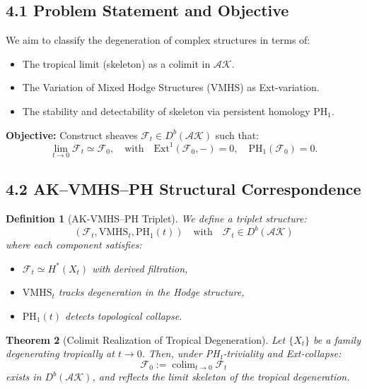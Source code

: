 \documentclass[11pt]{article}
\DeclareMathOperator{\colim}{colim}
\newtheorem{theorem}{Theorem}[section]
\newtheorem{definition}[theorem]{Definition}
\begin{document}
\subsection{4.1 Problem Statement and Objective}

We aim to classify the degeneration of complex structures in terms of:

\begin{itemize}
    \item The tropical limit (skeleton) as a colimit in \( \mathcal{AK} \).
    \item The Variation of Mixed Hodge Structures (VMHS) as Ext-variation.
    \item The stability and detectability of skeleton via persistent homology \( \mathrm{PH}_1 \).
\end{itemize}

\textbf{Objective:} Construct sheaves \( \mathcal{F}_t \in D^b(\mathcal{AK}) \) such that:
\[
\lim_{t \to 0} \mathcal{F}_t \simeq \mathcal{F}_0, \quad \text{with} \quad \mathrm{Ext}^1(\mathcal{F}_0, -) = 0, \quad \mathrm{PH}_1(\mathcal{F}_0) = 0.
\]

\subsection{4.2 AK--VMHS--PH Structural Correspondence}

\begin{definition}[AK-VMHS--PH Triplet]
We define a triplet structure:
\[
(\mathcal{F}_t, \mathrm{VMHS}_t, \mathrm{PH}_1(t)) \quad \text{with} \quad \mathcal{F}_t \in D^b(\mathcal{AK})
\]
where each component satisfies:
\begin{itemize}
    \item \( \mathcal{F}_t \simeq H^*(X_t) \) with derived filtration,
    \item \( \mathrm{VMHS}_t \) tracks degeneration in the Hodge structure,
    \item \( \mathrm{PH}_1(t) \) detects topological collapse.
\end{itemize}
\end{definition}

\begin{theorem}[Colimit Realization of Tropical Degeneration]
Let \( \{X_t\} \) be a family degenerating tropically at \( t \to 0 \). Then, under PH₁-triviality and Ext-collapse:
\[
\mathcal{F}_0 := \colim_{t \to 0} \mathcal{F}_t
\]
exists in \( D^b(\mathcal{AK}) \), and reflects the limit skeleton of the tropical degeneration.
\end{theorem}
\end{document}

